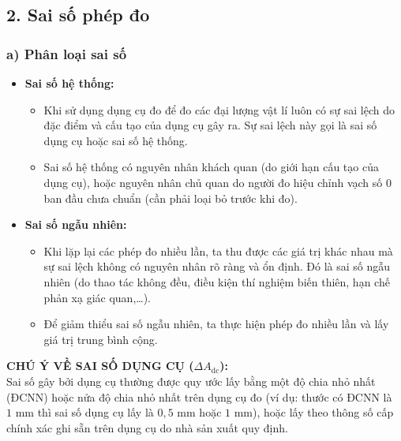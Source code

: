 \subsection*{2. Sai số phép đo}

\subsubsection*{a) Phân loại sai số}
\begin{itemize}
    \item \textbf{Sai số hệ thống:}
    \begin{itemize}
        \item Khi sử dụng dụng cụ đo để đo các đại lượng vật lí luôn có sự sai lệch do đặc điểm và cấu tạo của dụng cụ gây ra. Sự sai lệch này gọi là sai số dụng cụ hoặc sai số hệ thống.
        \item Sai số hệ thống có nguyên nhân khách quan (do giới hạn cấu tạo của dụng cụ), hoặc nguyên nhân chủ quan do người đo hiệu chỉnh vạch số 0 ban đầu chưa chuẩn (cần phải loại bỏ trước khi đo).
    \end{itemize}
    \item \textbf{Sai số ngẫu nhiên:}
    \begin{itemize}
        \item Khi lặp lại các phép đo nhiều lần, ta thu được các giá trị khác nhau mà sự sai lệch không có nguyên nhân rõ ràng và ổn định. Đó là sai số ngẫu nhiên (do thao tác không đều, điều kiện thí nghiệm biến thiên, hạn chế phản xạ giác quan,\dots).
        \item Để giảm thiểu sai số ngẫu nhiên, ta thực hiện phép đo nhiều lần và lấy giá trị trung bình cộng.
    \end{itemize}
\end{itemize}

\begin{tcolorbox}[colback=yellow!5,colframe=orange!80!black,arc=2mm,boxrule=0.8pt]
\textbf{CHÚ Ý VỀ SAI SỐ DỤNG CỤ ($\Delta A_{\text{dc}}$):}\\
Sai số gây bởi dụng cụ thường được quy ước lấy bằng một độ chia nhỏ nhất (ĐCNN) hoặc nửa độ chia nhỏ nhất trên dụng cụ đo (ví dụ: thước có ĐCNN là $1\text{ mm}$ thì sai số dụng cụ lấy là $0{,}5\text{ mm}$ hoặc $1\text{ mm}$), hoặc lấy theo thông số cấp chính xác ghi sẵn trên dụng cụ do nhà sản xuất quy định.
\end{tcolorbox}

